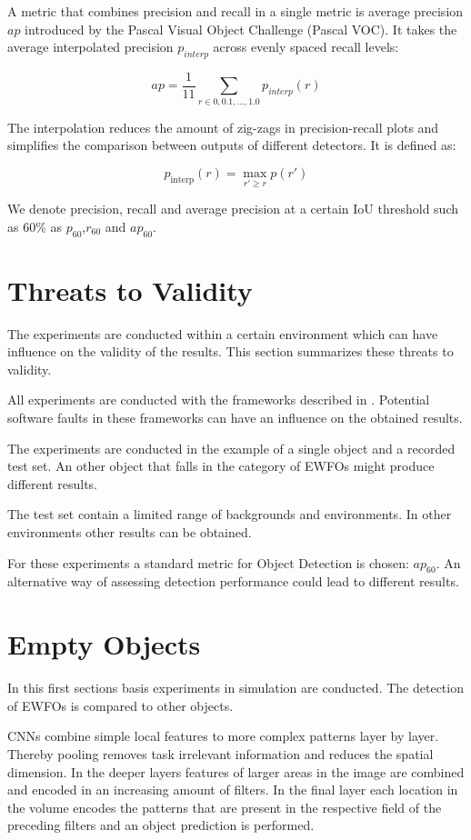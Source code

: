 A metric that combines precision and recall in a single metric is average precision $ap$ introduced by the Pascal Visual Object Challenge (Pascal VOC)\cite{Everingham2010}. It takes the average interpolated precision $p_{interp}$ across evenly spaced recall levels:

$$ ap = \frac{1}{11}\sum_{r \in {0,0.1,...,1.0}}p_{interp}(r)$$

The interpolation reduces the amount of zig-zags in precision-recall plots and simplifies the comparison between outputs of different detectors. It is defined as:

$$ p_\text{interp}(r) = \max\limits_{r' \geq r} p(r')$$

We denote precision, recall and average precision at a certain \ac{IoU} threshold such as 60\% as $p_{60}$,$r_{60}$ and $ap_{60}$.

\section{Threats to Validity}

The experiments are conducted within a certain environment which can have influence on the validity of the results. This section summarizes these threats to validity.

All experiments are conducted with the frameworks described in . Potential software faults in these frameworks can have an influence on the obtained results.

The experiments are conducted in the example of a single object and a recorded test set. An other object that falls in the category of \acp{EWFO} might produce different results.

The test set contain a limited range of backgrounds and environments. In other environments other results can be obtained.

For these experiments a standard metric for Object Detection is chosen: $ap_{60}$. An alternative way of assessing detection performance could lead to different results.

\section{Empty Objects}
\label{sec:empty}

In this first sections basis experiments in simulation are conducted. The detection of \acp{EWFO} is compared to other objects.

\acp{CNN} combine simple local features to more complex patterns layer by layer. Thereby pooling removes task irrelevant information and reduces the spatial dimension. In the deeper layers features of larger areas in the image are combined and encoded in an increasing amount of filters. In the final layer each location in the volume encodes the patterns that are present in the respective field of the preceding filters and an object prediction is performed.

